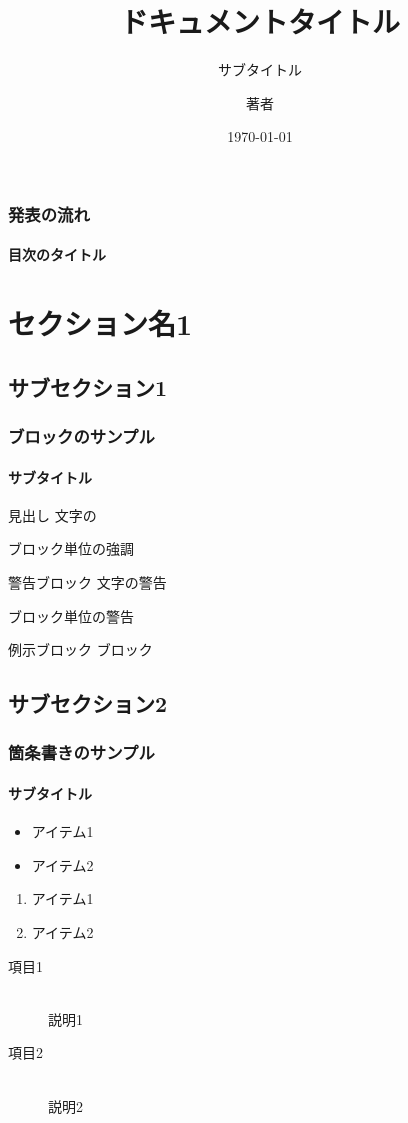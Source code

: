 \documentclass[aspectratio=169,cjk]{beamer} %
\title[短縮形]{ドキュメントタイトル}
\subtitle{サブタイトル}
\author{著者}
\institute[所属略称]{所属}
\date[短縮形]{\today}
\begin{document}
\begin{frame}[plain]
 \titlepage
\end{frame}

\begin{frame}[t] %
 \frametitle{発表の流れ}
 \framesubtitle{目次のタイトル}
 \tableofcontents %
\end{frame}

\section[セクション名1 短縮形]{セクション名1}
\subsection[セクション名1-1 短縮形]{サブセクション1}

\begin{frame}
 \frametitle{ブロックのサンプル}
 \framesubtitle{サブタイトル}

 \begin{block}{見出し}
  文字の

  \begin{structureenv}
   ブロック単位の強調
  \end{structureenv}
 \end{block}

 \begin{alertblock}{警告ブロック}
  文字の\alert{警告}

  \begin{alertenv}
   ブロック単位の警告
  \end{alertenv}
 \end{alertblock}

 \begin{exampleblock}{例示ブロック}
  ブロック
 \end{exampleblock}

\end{frame}

\subsection[セクション名1-2 短縮形]{サブセクション2}
\begin{frame}
 \frametitle{箇条書きのサンプル}
 \framesubtitle{サブタイトル}
 \begin{itemize}
  \item アイテム1
  \item アイテム2
 \end{itemize}
 \pause
 \begin{enumerate}
  \item アイテム1
  \item アイテム2
 \end{enumerate}
 \pause
 \begin{description}
  \item[項目1] \mbox{} \\
			 説明1
  \item[項目2] \mbox{} \\
			 説明2
 \end{description}
\end{frame}
\end{document}
